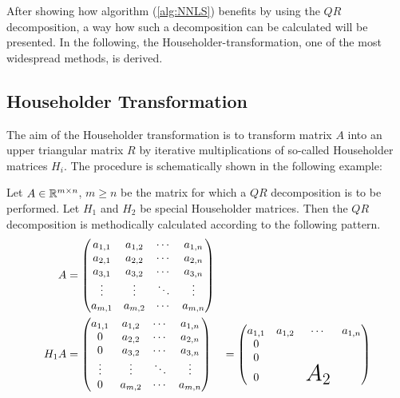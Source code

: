 After showing how algorithm (\ref{alg:NNLS}) benefits by using the $QR$ decomposition, a way how such a decomposition can be calculated will be presented. In the following, the Householder-transformation, one of the most widespread methods, is derived.

\subsection{Householder Transformation}  

The aim of the Householder transformation is to transform matrix $A$ into an upper triangular matrix $R$ by iterative multiplications of so-called Householder matrices $H_i$. 
The procedure is schematically shown in the following example: 

\begin{example}\label{ex:householder} 
	Let $A \in \mathbb{R}^{m \times n}$, $m \geq n$ be the matrix for which a $QR$ decomposition is to be performed. Let $H_1$ and $H_2$ be special Householder matrices. Then the $QR$ decomposition is methodically calculated according to the following pattern. 
	\begin{subequations}
		\begin{align*}
		A &= 
		\begin{pmatrix}
		a_{1,1} & a_{1,2} & \cdots & a_{1,n} \\
		a_{2,1} & a_{2,2} & \cdots & a_{2,n} \\
		a_{3,1} & a_{3,2} & \cdots & a_{3,n} \\
		\vdots  & \vdots  & \ddots & \vdots  \\
		a_{m,1} & a_{m,2} & \cdots & a_{m,n} 
		\end{pmatrix} 
		\\
		H_1 A &= 
		\begin{pmatrix}
		a_{1,1} & a_{1,2} & \cdots & a_{1,n} \\
		0		& a_{2,2} & \cdots & a_{2,n} \\
		0		& a_{3,2} & \cdots & a_{3,n} \\
		\vdots  & \vdots  & \ddots & \vdots  \\
		0		& a_{m,2} & \cdots & a_{m,n} 
		\end{pmatrix} 
		&= 
		\begin{pmatrix}
		a_{1,1} & a_{1,2} & \cdots & a_{1,n} \\
		0 		&  		  &		   &  \\
		0 		&  		  &		   &  \\
		0  		&   	  & \text{\huge$A_2$} &   \\

\end{pmatrix}
\end{align*}
\end{subequations}
\end{example}
